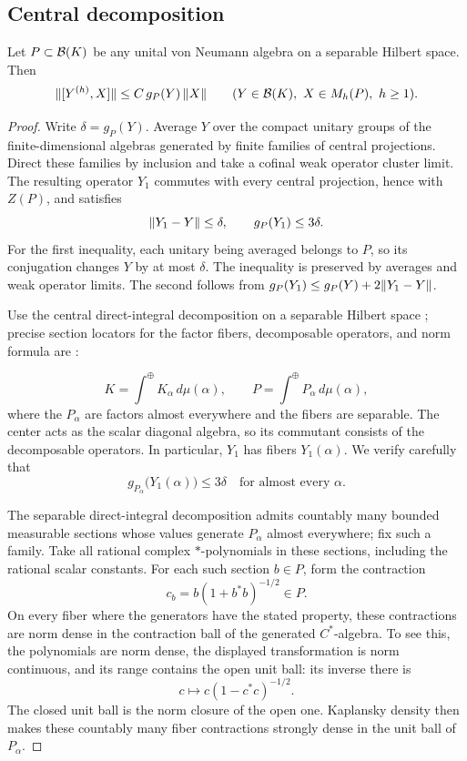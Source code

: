 \subsection{Central decomposition}

\begin{proposition}\label{prop:separable-estimate}
Let $P\subset\mathcal B(K)$ be any unital von Neumann algebra on a separable
Hilbert space.  Then
\[
 \lVert[Y^{(h)},X]\rVert\le C\,g_P(Y)\,\lVert X\rVert
 \qquad(Y\in\mathcal B(K),\ X\in M_h(P),\ h\ge1).
\]
\end{proposition}

\begin{proof}
Write $\delta=g_P(Y)$.  Average $Y$ over the compact unitary groups of the
finite-dimensional algebras generated by finite families of central
projections.  Direct these families by inclusion and take a cofinal weak
operator cluster limit.  The resulting operator $Y_1$ commutes with every
central projection, hence with $Z(P)$, and satisfies
\begin{equation}\label{eq:center-average}
 \lVert Y_1-Y\rVert\le\delta,
 \qquad g_P(Y_1)\le3\delta.
\end{equation}
For the first inequality, each unitary being averaged belongs to $P$, so
its conjugation changes $Y$ by at most $\delta$.  The inequality is
preserved by averages and weak operator limits.  The second follows from
$g_P(Y_1)\le g_P(Y)+2\lVert Y_1-Y\rVert$.

Use the central direct-integral decomposition on a separable Hilbert
space \citep{Takesaki1979}; precise section locators for the
factor fibers, decomposable operators, and norm formula are
\citet[Sections~III.1.6.1--4 and III.5.1.10--15]{Blackadar2006}:

\[
 K=\int^{\oplus}K_\alpha\,d\mu(\alpha),
 \qquad
 P=\int^{\oplus}P_\alpha\,d\mu(\alpha),
\]
where the $P_\alpha$ are factors almost everywhere and the fibers are
separable.  The center acts as the scalar diagonal algebra, so its
commutant consists of the decomposable operators.  In particular, $Y_1$
has fibers $Y_1(\alpha)$.  We verify carefully that
\begin{equation}\label{eq:fiber-commutator}
 g_{P_\alpha}\bigl(Y_1(\alpha)\bigr)\le3\delta
 \quad\text{for almost every }\alpha.
\end{equation}

The separable direct-integral decomposition admits countably many bounded
measurable sections whose values generate $P_\alpha$ almost everywhere;
fix such a family. Take all rational complex $*$-polynomials in
these sections, including the rational scalar constants.  For each such
section $b\in P$, form the contraction
\[
 c_b=b(1+b^*b)^{-1/2}\in P.
\]
On every fiber where the generators have the stated property, these
contractions are norm dense in the contraction ball of the generated
$C^*$-algebra.  To see this, the polynomials are norm dense, the displayed
transformation is norm continuous, and its range contains the open unit
ball: its inverse there is
\[
 c\longmapsto c(1-c^*c)^{-1/2}.
\]
The closed unit ball is the norm closure of the open one.  Kaplansky
density then makes these countably many fiber contractions strongly
dense in the unit ball of $P_\alpha$.


\end{proof}
